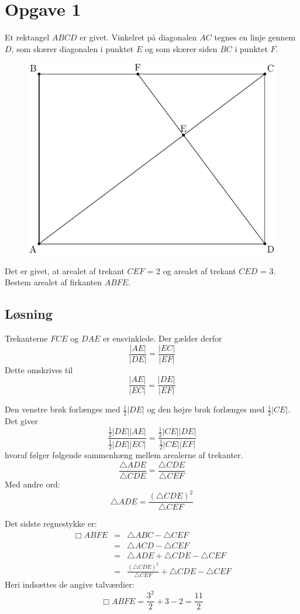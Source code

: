 \documentclass[12pt,oneside,a4paper]{article}
\newcommand{\bas}{\begin{eqnarray*}}
\newcommand{\eas}{\end{eqnarray*}}
\begin{document}
\section{Opgave 1}
Et rektangel $ABCD$ er givet. Vinkelret på diagonalen $AC$ tegnes en linje gennem $D$, som skærer diagonalen i punktet $E$ og som skærer siden $BC$ i punktet $F$.

\begin{figure}[ht]
\begin{center}
\includegraphics{fig1.pdf}
\label{fig1}
\end{center}
\end{figure}

Det er givet, at arealet af trekant $CEF$ = 2 og arealet af trekant $CED$ = 3. Bestem arealet af firkanten $ABFE$.

\subsection{Løsning}
Trekanterne $FCE$ og $DAE$ er ensvinklede. Der gælder derfor
$$
\frac{|AE|}{|DE|} = \frac{|EC|}{|EF|}
$$
Dette omskrives til
$$
\frac{|AE|}{|EC|} = \frac{|DE|}{|EF|}
$$

Den venstre brøk forlænges med $\frac 12 |DE|$ og den højre brøk forlænges med $\frac 12 |CE|$. Det giver
$$
\frac{\frac 12 |DE| |AE|}{\frac 12 |DE| |EC|} = \frac{\frac 12 |CE| |DE|}{\frac 12 |CE| |EF|}
$$
hvoraf følger følgende sammenhæng mellem arealerne af trekanter.
$$
\frac{\bigtriangleup ADE}{\bigtriangleup CDE} = \frac{\bigtriangleup CDE}{\bigtriangleup CEF}
$$
Med andre ord:
$$
\bigtriangleup ADE = \frac{\left(\bigtriangleup CDE\right)^2}{\bigtriangleup CEF}
$$

Det sidste regnestykke er:
\bas
\Box ABFE &=& \bigtriangleup ABC - \bigtriangleup CEF \\
          &=& \bigtriangleup ACD - \bigtriangleup CEF \\
          &=& \bigtriangleup ADE + \bigtriangleup CDE - \bigtriangleup CEF \\
          &=& \frac{\left(\bigtriangleup CDE\right)^2}{\bigtriangleup CEF} + \bigtriangleup CDE - \bigtriangleup CEF
\eas
Heri indsættes de angive talværdier:
$$
\Box ABFE = \frac{3^2}{2} + 3 - 2 = \frac{11}{2}
$$
\end{document}
